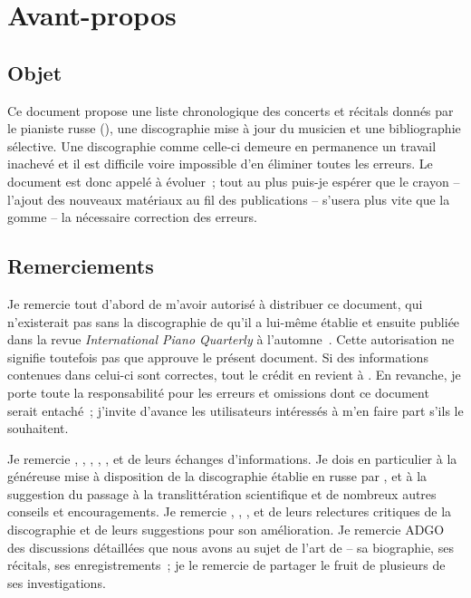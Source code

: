 \chapter[%
Avant-propos][%
Avant-propos]{%
Avant-propos}
\label{chap:Avant-propos}

\section{Objet}

Ce document propose une liste chronologique des concerts et récitals donnés
par le pianiste russe \VSofronitsky{} (), une
discographie mise à jour du musicien et une bibliographie sélective.
Une discographie comme celle-ci demeure en permanence un travail inachevé et
il est difficile voire impossible d'en éliminer toutes les erreurs.
Le document est donc appelé à évoluer~; tout au plus puis-je espérer que le
crayon -- l'ajout des nouveaux matériaux au fil des publications -- s'usera
plus vite que la gomme -- la nécessaire correction des erreurs.

\section{Remerciements}

Je remercie tout d'abord \FMalik{} de m'avoir autorisé à distribuer ce
document, qui n'existerait pas sans la discographie de \Sofronitsky{} qu'il
a lui-même établie et ensuite publiée dans la revue \emph{International
Piano Quarterly} à l'automne~\citeyear{Malik}.
Cette autorisation ne signifie toutefois pas que \FMalik{} approuve le
présent document.
Si des informations contenues dans celui-ci sont correctes, tout le crédit
en revient à \FMalik{}.
En revanche, je porte toute la responsabilité pour les erreurs et omissions
dont ce document serait entaché~; j'invite d'avance les utilisateurs
intéressés à m'en faire part s'ils le souhaitent.

Je remercie \MMourgue{}, \MDupuy{}, \RQuonten{}, \DCordova{}, \ARossi{},
\FGiuntoli{} et \VVoskobojnikov{} de leurs échanges d'informations.
Je dois en particulier à \ARossi{} la généreuse mise à disposition de la
discographie établie en russe par \INikonovich{}
\citep[voir][]{Nikonovich11}, et à \FGiuntoli{} la suggestion du passage à
la translittération scientifique et de nombreux autres conseils et
encouragements.
Je remercie \MDupuy{}, \RQuonten{}, \DCordova{}, \ARossi{} et \FGiuntoli{}
de leurs relectures critiques de la discographie et de leurs suggestions
pour son amélioration.
Je remercie ADGO des discussions détaillées que nous avons au sujet de l'art
de \VSofronitsky{} -- sa biographie, ses récitals, ses enregistrements~; je
le remercie de partager le fruit de plusieurs de ses investigations.

